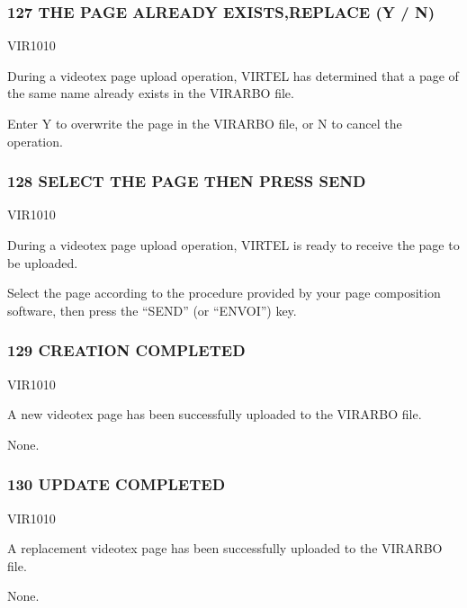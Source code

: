 \documentclass[letterpaper,10pt,english]{sphinxmanual}
\begin{document}
\subsubsection{127 THE PAGE ALREADY EXISTS,REPLACE (Y / N)}
\label{\detokenize{messages:the-page-already-exists-replace-y-n}}\begin{description}
\sphinxAtStartPar
VIR1010

\sphinxAtStartPar
During a videotex page upload operation, VIRTEL has determined that a page of the same name already exists in the VIRARBO file.

\sphinxAtStartPar
Enter Y to overwrite the page in the VIRARBO file, or N to cancel the operation.

\end{description}


\subsubsection{128 SELECT THE PAGE THEN PRESS SEND}
\label{\detokenize{messages:select-the-page-then-press-send}}\begin{description}
\sphinxAtStartPar
VIR1010

\sphinxAtStartPar
During a videotex page upload operation, VIRTEL is ready to receive the page to be uploaded.

\sphinxAtStartPar
Select the page according to the procedure provided by your page composition software, then press the “SEND” (or “ENVOI”) key.

\end{description}


\subsubsection{129 CREATION COMPLETED}
\label{\detokenize{messages:creation-completed}}\begin{description}
\sphinxAtStartPar
VIR1010

\sphinxAtStartPar
A new videotex page has been successfully uploaded to the VIRARBO file.

\sphinxAtStartPar
None.

\end{description}


\subsubsection{130 UPDATE COMPLETED}
\label{\detokenize{messages:update-completed}}\begin{description}
\sphinxAtStartPar
VIR1010

\sphinxAtStartPar
A replacement videotex page has been successfully uploaded to the VIRARBO file.

\sphinxAtStartPar
None.

\end{description}
\end{document}
